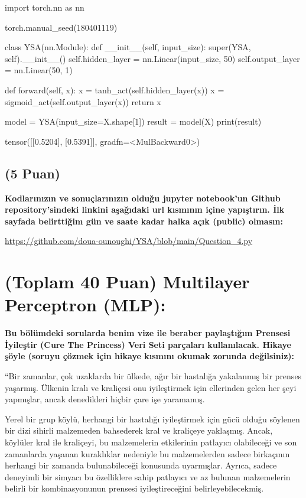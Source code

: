 \documentclass[11pt]{article}
\begin{document}
\begin{python}
import torch.nn as nn

torch.manual_seed(180401119)

class YSA(nn.Module):
    def __init__(self, input_size):
        super(YSA, self).__init__()
        self.hidden_layer = nn.Linear(input_size, 50)
        self.output_layer = nn.Linear(50, 1)

    def forward(self, x):
        x = tanh_act(self.hidden_layer(x))
        x =  sigmoid_act(self.output_layer(x))
        return x
        
model = YSA(input_size=X.shape[1])
result = model(X)
print(result)
\end{python}

tensor([[0.5204],
        [0.5391]], gradfn=<MulBackward0>)

\subsection{(5 Puan)} \textbf{Kodlarınızın ve sonuçlarınızın olduğu jupyter notebook'un Github repository'sindeki linkini aşağıdaki url kısmının içine yapıştırın. İlk sayfada belirttiğim gün ve saate kadar halka açık (public) olmasın:}

\url{https://github.com/doua-ounoughi/YSA/blob/main/Question_4.py}

\section{(Toplam 40 Puan) Multilayer Perceptron (MLP):} 
\textbf{Bu bölümdeki sorularda benim vize ile beraber paylaştığım Prensesi İyileştir (Cure The Princess) Veri Seti parçaları kullanılacak. Hikaye şöyle (soruyu çözmek için hikaye kısmını okumak zorunda değilsiniz):} 

``Bir zamanlar, çok uzaklarda bir ülkede, ağır bir hastalığa yakalanmış bir prenses yaşarmış. Ülkenin kralı ve kraliçesi onu iyileştirmek için ellerinden gelen her şeyi yapmışlar, ancak denedikleri hiçbir çare işe yaramamış.

Yerel bir grup köylü, herhangi bir hastalığı iyileştirmek için gücü olduğu söylenen bir dizi sihirli malzemeden bahsederek kral ve kraliçeye yaklaşmış. Ancak, köylüler kral ile kraliçeyi, bu malzemelerin etkilerinin patlayıcı olabileceği ve son zamanlarda yaşanan kuraklıklar nedeniyle bu malzemelerden sadece birkaçının herhangi bir zamanda bulunabileceği konusunda uyarmışlar. Ayrıca, sadece deneyimli bir simyacı bu özelliklere sahip patlayıcı ve az bulunan malzemelerin belirli bir kombinasyonunun prensesi iyileştireceğini belirleyebilecekmiş.
\end{document}
